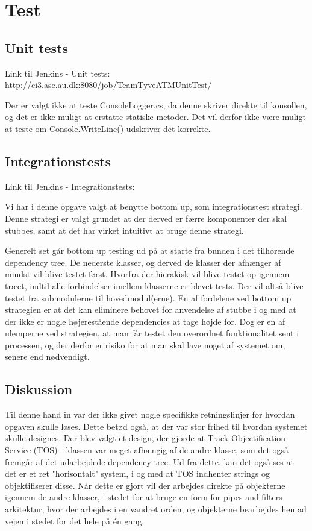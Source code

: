 \graphicspath{{Billeder/}}
\chapter{Test}
\section{Unit tests}
Link til Jenkins - Unit tests: \url{http://ci3.ase.au.dk:8080/job/TeamTyveATMUnitTest/} \newline 

Der er valgt ikke at teste ConsoleLogger.cs, da denne skriver direkte til konsollen, og det er ikke muligt at erstatte statiske metoder. Det vil derfor ikke være muligt at teste om Console.WriteLine() udskriver det korrekte. 

\section{Integrationstests}
Link til Jenkins - Integrationstests: \newline \newline

Vi har i denne opgave valgt at benytte bottom up, som integrationstest strategi.\tabularnewline
Denne strategi er valgt grundet at der derved er færre komponenter der skal stubbes, samt at det har virket intuitivt at bruge denne strategi.

Generelt set går bottom up testing ud på at starte fra bunden i det tilhørende dependency tree. De nederste klasser, og derved de klasser der afhænger af mindst vil blive testet først. Hvorfra der hierakisk vil blive testet op igennem træet, indtil alle forbindelser imellem klasserne er blevet tests. Der vil altså blive testet fra submodulerne til hovedmodul(erne).
En af fordelene ved bottom up strategien er at det kan eliminere behovet for anvendelse af stubbe i og med at der ikke er nogle højerestående dependencies at tage højde for. Dog er en af ulemperne ved strategien, at man får testet den overordnet funktionalitet sent i processen, og der derfor er risiko for at man skal lave noget af systemet om, senere end nødvendigt. 

\section{Diskussion}
Til denne hand in var der ikke givet nogle specifikke retningslinjer for hvordan opgaven skulle løses. Dette betød også, at der var stor frihed til hvordan systemet skulle designes. \tabularnewline
Der blev valgt et design, der gjorde at Track Objectification Service (TOS) - klassen var meget afhængig af de andre klasse, som det også fremgår af det udarbejdede dependency tree. 
Ud fra dette, kan det også ses at det er et ret "horisontalt" system, i og med at TOS indhenter strings og objektifiserer disse. 
Når dette er gjort vil der arbejdes direkte på objekterne igennem de andre klasser, i stedet for at bruge en form for pipes and filters arkitektur, hvor der arbejdes i en vandret orden, og objekterne bearbejdes hen ad vejen i stedet for det hele på én gang. 

